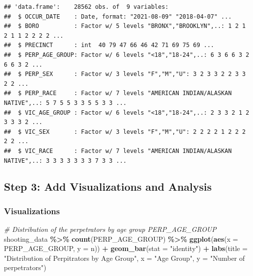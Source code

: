 \documentclass[
]{article}
\newenvironment{Shaded}{\begin{snugshade}}{\end{snugshade}}
\newcommand{\AttributeTok}[1]{\textcolor[rgb]{0.13,0.29,0.53}{#1}}
\newcommand{\CommentTok}[1]{\textcolor[rgb]{0.56,0.35,0.01}{\textit{#1}}}
\newcommand{\FunctionTok}[1]{\textcolor[rgb]{0.13,0.29,0.53}{\textbf{#1}}}
\newcommand{\NormalTok}[1]{#1}
\newcommand{\SpecialCharTok}[1]{\textcolor[rgb]{0.81,0.36,0.00}{\textbf{#1}}}
\newcommand{\StringTok}[1]{\textcolor[rgb]{0.31,0.60,0.02}{#1}}
\begin{document}
\begin{verbatim}
## 'data.frame':    28562 obs. of  9 variables:
##  $ OCCUR_DATE    : Date, format: "2021-08-09" "2018-04-07" ...
##  $ BORO          : Factor w/ 5 levels "BRONX","BROOKLYN",..: 1 2 1 2 1 1 2 2 2 2 ...
##  $ PRECINCT      : int  40 79 47 66 46 42 71 69 75 69 ...
##  $ PERP_AGE_GROUP: Factor w/ 6 levels "<18","18-24",..: 6 3 6 6 3 2 6 6 3 2 ...
##  $ PERP_SEX      : Factor w/ 3 levels "F","M","U": 3 2 3 3 2 2 3 3 2 2 ...
##  $ PERP_RACE     : Factor w/ 7 levels "AMERICAN INDIAN/ALASKAN NATIVE",..: 5 7 5 5 3 3 5 5 3 3 ...
##  $ VIC_AGE_GROUP : Factor w/ 6 levels "<18","18-24",..: 2 3 3 2 1 2 3 3 3 2 ...
##  $ VIC_SEX       : Factor w/ 3 levels "F","M","U": 2 2 2 2 1 2 2 2 2 2 ...
##  $ VIC_RACE      : Factor w/ 7 levels "AMERICAN INDIAN/ALASKAN NATIVE",..: 3 3 3 3 3 3 3 7 3 3 ...
\end{verbatim}

\subsection{Step 3: Add Visualizations and
Analysis}\label{step-3-add-visualizations-and-analysis}

\subsubsection{Visualizations}\label{visualizations}

\begin{Shaded}
\begin{Highlighting}[]
\CommentTok{\# Distribution of the perpetrators by age group PERP\_AGE\_GROUP}
\NormalTok{shooting\_data }\SpecialCharTok{\%\textgreater{}\%}
  \FunctionTok{count}\NormalTok{(PERP\_AGE\_GROUP) }\SpecialCharTok{\%\textgreater{}\%}
  \FunctionTok{ggplot}\NormalTok{(}\FunctionTok{aes}\NormalTok{(}\AttributeTok{x =}\NormalTok{ PERP\_AGE\_GROUP, }\AttributeTok{y =}\NormalTok{ n)) }\SpecialCharTok{+}
  \FunctionTok{geom\_bar}\NormalTok{(}\AttributeTok{stat =} \StringTok{"identity"}\NormalTok{) }\SpecialCharTok{+}
  \FunctionTok{labs}\NormalTok{(}\AttributeTok{title =} \StringTok{"Distribution of Perpitrators by Age Group"}\NormalTok{,}
       \AttributeTok{x =} \StringTok{"Age Group"}\NormalTok{,}
       \AttributeTok{y =} \StringTok{"Number of perpetrators"}\NormalTok{)}
\end{Highlighting}
\end{Shaded}
\end{document}
